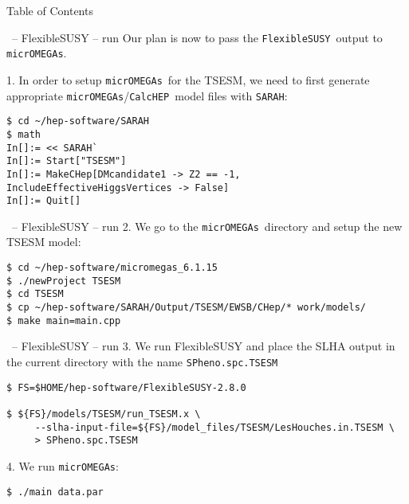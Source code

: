 \documentclass[11pt]{beamer}
\newcommand{\CalcHEP}{\texttt{CalcHEP}}
\newcommand{\FlexibleSUSY}{\texttt{FlexibleSUSY}}
\newcommand{\micrOMEGAs}{\texttt{micrOMEGAs}}
\newcommand{\SARAH}{\texttt{SARAH}}
\begin{document}

\begin{frame}{Table of Contents}
\end{frame}


\begin{frame}[fragile]{\insertsection\ -- FlexibleSUSY -- run}
  Our plan is now to pass the \FlexibleSUSY\ output to \micrOMEGAs.

  \medskip

  1. In order to setup \micrOMEGAs\ for the TSESM, we need to first
  generate appropriate \micrOMEGAs/\CalcHEP\ model files with \SARAH:
  \begin{lstlisting}
$ cd ~/hep-software/SARAH
$ math
In[]:= << SARAH`
In[]:= Start["TSESM"]
In[]:= MakeCHep[DMcandidate1 -> Z2 == -1, IncludeEffectiveHiggsVertices -> False]
In[]:= Quit[]\end{lstlisting}%
\end{frame}


\begin{frame}[fragile]{\insertsection\ -- FlexibleSUSY -- run}
  2. We go to the \micrOMEGAs\ directory and setup the new TSESM
  model:
  \begin{lstlisting}
$ cd ~/hep-software/micromegas_6.1.15
$ ./newProject TSESM
$ cd TSESM
$ cp ~/hep-software/SARAH/Output/TSESM/EWSB/CHep/* work/models/
$ make main=main.cpp\end{lstlisting}%
\end{frame}


\begin{frame}[fragile]{\insertsection\ -- FlexibleSUSY -- run}
  3. We run FlexibleSUSY and place the SLHA output in the current
  directory with the name \texttt{SPheno.spc.TSESM}
  \begin{lstlisting}
$ FS=$HOME/hep-software/FlexibleSUSY-2.8.0

$ ${FS}/models/TSESM/run_TSESM.x \
     --slha-input-file=${FS}/model_files/TSESM/LesHouches.in.TSESM \
     > SPheno.spc.TSESM\end{lstlisting}%
  4. We run \micrOMEGAs:
  \begin{lstlisting}
$ ./main data.par\end{lstlisting}%
\end{frame}
\end{document}
